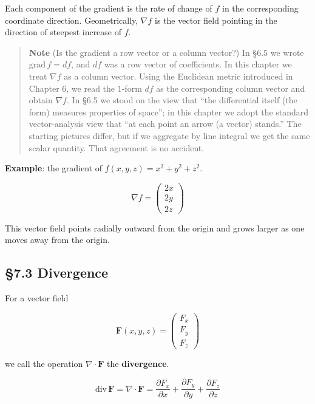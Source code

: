 \documentclass[a4paper,12pt,openany]{book}
\begin{document}
Each component of the gradient is the rate of change of \(f\) in the
corresponding coordinate direction. Geometrically, \(\nabla f\) is the
vector field pointing in the direction of steepest increase of \(f\).

\begin{quote}
\textbf{Note} (Is the gradient a row vector or a column vector?) In §6.5
we wrote \(\mathrm{grad}\,f = df\), and \(df\) was a row vector of
coefficients. In this chapter we treat \(\nabla f\) as a column vector.
Using the Euclidean metric introduced in Chapter 6, we read the
\(1\)-form \(df\) as the corresponding column vector and obtain
\(\nabla f\). In §6.5 we stood on the view that ``the differential
itself (the form) measures properties of space''; in this chapter we
adopt the standard vector-analysis view that ``at each point an arrow (a
vector) stands.'' The starting pictures differ, but if we aggregate by
line integral we get the same scalar quantity. That agreement is no
accident.
\end{quote}

\textbf{Example}: the gradient of \(f(x,y,z) = x^2 + y^2 + z^2\).

\[\nabla f = \begin{pmatrix} 2x \\ 2y \\ 2z \end{pmatrix}\]

This vector field points radially outward from the origin and grows
larger as one moves away from the origin.

\par\vspace{0.35em}\par

\hypertarget{divergence}{%
\subsection{§7.3 Divergence}\label{divergence}}

For a vector field

\[
\mathbf{F}(x,y,z)
=
\begin{pmatrix}
F_x\\
F_y\\
F_z
\end{pmatrix}
\]

we call the operation \(\nabla\cdot\mathbf{F}\) the \textbf{divergence}.

\[\mathrm{div}\,\mathbf{F} = \nabla \cdot \mathbf{F} = \frac{\partial F_x}{\partial x} + \frac{\partial F_y}{\partial y} + \frac{\partial F_z}{\partial z}\]
\end{document}
